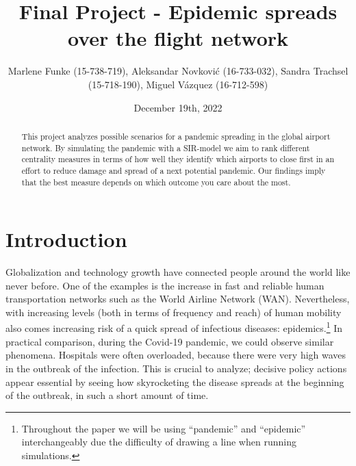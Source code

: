 \documentclass{Template_resources/netsci-project}
\begin{document}
\title{Final Project - Epidemic spreads over the flight network}
\author{Marlene Funke (15-738-719), Aleksandar Novković (16-733-032), Sandra Trachsel (15-718-190), Miguel Vázquez (16-712-598)}
\date{December 19th, 2022}
\maketitle


\begin{abstract}
This project analyzes possible scenarios for a pandemic spreading in the global airport network. By simulating the pandemic with a SIR-model we aim to rank different centrality measures in terms of how well they identify which airports to close first in an effort to reduce damage and spread of a next potential pandemic. Our findings imply that the best measure depends on which outcome you care about the most.
\end{abstract}


\section{Introduction}
Globalization and technology growth have connected people around the world like never before. One of the examples is the increase in fast and reliable human transportation networks such as the World Airline Network (WAN). Nevertheless, with increasing levels (both in terms of frequency and reach) of human mobility also comes increasing risk of a quick spread of infectious diseases: epidemics.\footnote{Throughout the paper we will be using ``pandemic'' and ``epidemic'' interchangeably due the difficulty of drawing a line when running simulations.} In practical comparison, during the Covid-19 pandemic, we could observe similar phenomena. Hospitals were often overloaded, because there were very high waves in the outbreak of the infection. This is crucial to analyze; decisive policy actions appear essential by seeing how skyrocketing the disease spreads at the beginning of the outbreak, in such a short amount of time.
\end{document}
